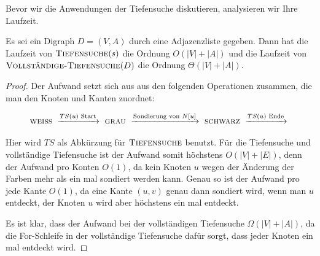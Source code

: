 
\begin{bem}
	Bevor wir die Anwendungen der Tiefensuche diskutieren, analysieren wir Ihre Laufzeit. 
\end{bem} 

\begin{thm}
\label{thm:laufzeit-tiefensuche}
Es sei ein Digraph $D=(V,A)$ durch eine Adjazenzliste gegeben. Dann hat die Laufzeit von $\mathop{\text{\textsc{Tiefensuche}}}(s)$ die Ordnung $O(|V|+|A|)$ und die  Laufzeit von $\mathop{\text{\textsc{Vollständige-Tiefensuche}}}(D)$ die Ordnung $\Theta(|V|+|A|)$.
\end{thm}

\begin{proof}
Der Aufwand setzt sich aus aus den folgenden Operationen zusammen, die man den Knoten und Kanten zuordnet: 

\begin{equation*}
	\cc{weiss} 
	\ \xrightarrow{\text{$TS(u)$ Start}} \ 
	\cc{grau}
	\ \xrightarrow{\text{Sondierung von $N[u]$}}
	\ \cc{schwarz} 
	\  \xrightarrow{\text{$TS(u)$ Ende}} \ 
\end{equation*} 

Hier wird $TS$ als Abkürzung für $\mathop{\text{\textsc{Tiefensuche}}}$ benutzt. Für die Tiefensuche und vollständige Tiefensuche ist der Aufwand somit höchstens $O(|V|+|E|)$, denn der Aufwand pro Konten  $O(1)$, da kein Knoten $u$ wegen der Änderung der Farben mehr als ein mal sondiert werden kann. Genau so ist der Aufwand pro jede Kante $O(1)$, da eine Kante $(u,v)$ genau dann sondiert wird, wenn man $u$ entdeckt, der Knoten $u$ wird aber höchstens ein mal entdeckt. 

Es ist klar, dass der Aufwand bei der vollständigen Tiefensuche $\Omega(|V|+|A|)$, da die For-Schleife in der vollständige Tiefensuche dafür sorgt, dass jeder Knoten ein mal entdeckt wird. 
\end{proof}


